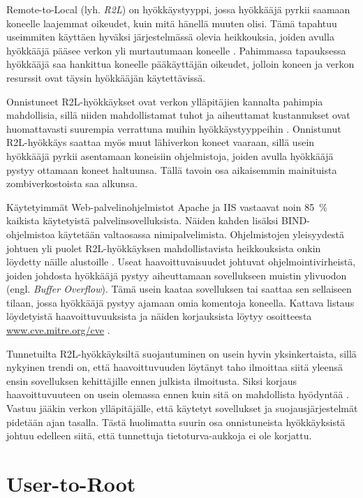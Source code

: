 Remote-to-Local (lyh. \textit{R2L}) on hyökkäystyyppi, jossa hyökkääjä pyrkii
saamaan koneelle laajemmat oikeudet, kuin mitä hänellä muuten
olisi. Tämä tapahtuu useimmiten käyttäen hyväksi järjestelmässä olevia
heikkouksia, joiden avulla hyökkääjä pääsee verkon yli murtautumaan
koneelle \cite{IDS}. Pahimmassa tapauksessa hyökkääjä saa hankittua koneelle
pääkäyttäjän oikeudet, jolloin koneen ja verkon resurssit ovat täysin
hyökkääjän käytettävissä.

Onnistuneet R2L-hyökkäykset ovat verkon ylläpitäjien kannalta pahimpia
mahdollisia, sillä niiden mahdollistamat tuhot ja aiheuttamat kustannukset ovat
huomattavasti suurempia verrattuna muihin hyökkäystyyppeihin \cite{IDSb}. Onnistunut R2L-hyökkäys saattaa
myös muut lähiverkon koneet vaaraan, sillä usein hyökkääjä pyrkii asentamaan
koneisiin ohjelmistoja, joiden avulla hyökkääjä pystyy ottamaan koneet haltuunsa.
Tällä tavoin osa aikaisemmin mainituista zombiverkostoista saa alkunsa.

Käytetyimmät Web-palvelinohjelmistot Apache ja IIS vastaavat noin 85~\%
kaikista käytetyistä palvelinsovelluksista. Näiden kahden lisäksi
BIND-\-ohjelmistoa käytetään valtaosassa nimipalvelimista. Ohjelmistojen yleisyydestä
johtuen yli puolet R2L-hyökkäyksen mahdollistavista heikkouksista onkin
löydetty näille alustoille \cite{IDS}. Useat haavoittuvaisuudet johtuvat
ohjelmointivirheistä, joiden johdosta hyökkääjä pystyy aiheuttamaan
sovellukseen muistin ylivuodon (engl. \textit{Buffer Overflow}). Tämä usein kaataa
sovelluksen tai saattaa sen sellaiseen tilaan, jossa hyökkääjä pystyy ajamaan
omia komentoja koneella. Kattava listaus löydetyistä haavoittuvuuksista ja näiden
korjauksista löytyy osoitteesta \url{www.cve.mitre.org/cve} \cite{CVE}.

Tunnetuilta R2L-hyökkäyksiltä suojautuminen on usein hyvin yksinkertaista, sillä
nykyinen trendi on, että haavoittuvuuden löytänyt taho ilmoittaa siitä yleensä ensin
sovelluksen kehittäjille ennen julkista ilmoitusta. Siksi korjaus
haavoittuvuuteen on usein olemassa ennen kuin sitä on mahdollista hyödyntää \cite{IDSb}.
Vastuu jääkin verkon ylläpitäjälle, että käytetyt sovellukset ja 
suojausjärjestelmät pidetään ajan tasalla. Tästä huolimatta suurin osa onnistuneista hyökkäyksistä 
johtuu edelleen siitä, että tunnettuja tietoturva-aukkoja ei ole korjattu.

\section{User-to-Root}

